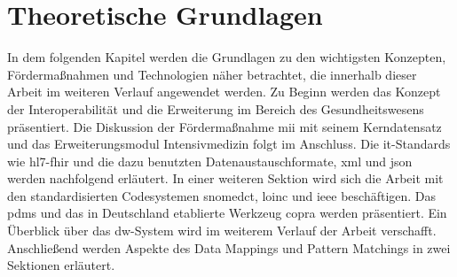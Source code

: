 \chapter{Theoretische Grundlagen} \label{ch:theobasis}

In dem folgenden Kapitel werden die Grundlagen zu den wichtigsten Konzepten, Fördermaßnahmen und Technologien näher betrachtet, die innerhalb dieser Arbeit im weiteren Verlauf angewendet werden. Zu Beginn werden das Konzept der Interoperabilität und die Erweiterung im Bereich des Gesundheitswesens präsentiert. Die Diskussion der Fördermaßnahme \glqq \ac{mii}\grqq{} mit seinem Kerndatensatz und das Erweiterungsmodul Intensivmedizin folgt im Anschluss. Die \ac{it}-Standards wie \ac{hl7}-\ac{fhir} und die dazu benutzten Datenaustauschformate, \ac{xml} und \ac{json} werden nachfolgend erläutert. In einer weiteren Sektion wird sich die Arbeit mit den standardisierten Codesystemen \ac{snomedct}, \ac{loinc} und \ac{ieee} beschäftigen. Das \ac{pdms} und das in Deutschland etablierte Werkzeug \ac{copra} werden präsentiert. Ein Überblick über das \ac{dw}-System wird im weiterem Verlauf der Arbeit verschafft. Anschließend werden Aspekte des Data Mappings und Pattern Matchings in zwei Sektionen erläutert.
